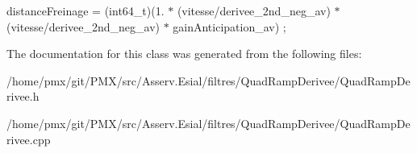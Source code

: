 distance\+Freinage = (int64\+\_\+t)(1. $\ast$ (vitesse/derivee\+\_\+2nd\+\_\+neg\+\_\+av) $\ast$ (vitesse/derivee\+\_\+2nd\+\_\+neg\+\_\+av) $\ast$ gain\+Anticipation\+\_\+av) ; 

The documentation for this class was generated from the following files\+:\begin{DoxyCompactItemize}
\item 
/home/pmx/git/\+P\+M\+X/src/\+Asserv.\+Esial/filtres/\+Quad\+Ramp\+Derivee/Quad\+Ramp\+Derivee.\+h\item 
/home/pmx/git/\+P\+M\+X/src/\+Asserv.\+Esial/filtres/\+Quad\+Ramp\+Derivee/Quad\+Ramp\+Derivee.\+cpp\end{DoxyCompactItemize}

